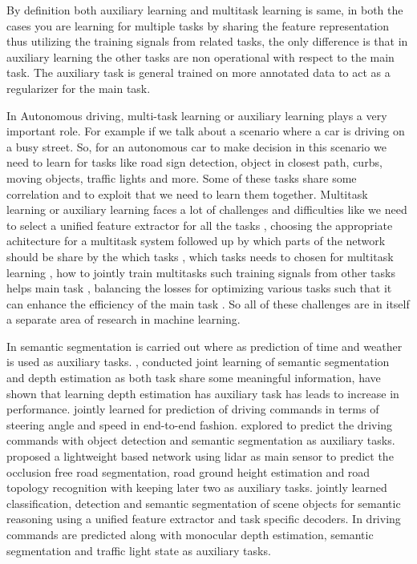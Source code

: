     By definition both auxiliary learning and multitask learning is same, in both the cases you are learning for multiple tasks by sharing the feature representation thus utilizing the training signals from related tasks, the only difference is that in auxiliary learning the other tasks are non operational with respect to the main task. The auxiliary task is general trained on more annotated data to act as a regularizer for the main task. 
    
    In Autonomous driving, multi-task learning or auxiliary learning plays a very important role. For example if we talk about a scenario where a car is driving on a busy street. So, for an autonomous car to make decision in this scenario we need to learn for tasks like road sign detection, object in closest path, curbs, moving objects, traffic lights and more. Some of these tasks share some correlation and to exploit that we need to learn them together. Multitask learning or auxiliary learning faces a lot of challenges and difficulties like we need to select a unified feature extractor for all the tasks \cite{DBLP:journals/corr/abs-2108-11353}, choosing the appropriate achitecture for a multitask system followed up by which parts of the network should be share by the which tasks \cite {Liu_2020_ACCV} \cite{ruder2018latent} \cite{DBLP:journals/corr/abs-1904-02920}, which tasks needs to chosen for multitask learning \cite{DBLP:journals/corr/abs-2110-07301} \cite{DBLP:journals/corr/abs-1904-04153}, how to jointly train multitasks such training signals from other tasks helps main task \cite{DBLP:journals/corr/abs-1903-12117} \cite{DBLP:journals/corr/abs-2007-06889} \cite{DBLP:journals/corr/abs-2001-06782} \cite{Guo_2018_ECCV}, balancing the losses for optimizing various tasks such that it can enhance the efficiency of the main task \cite{DBLP:journals/corr/abs-1904-08492} \cite{pmlr-v80-chen18a} \cite{du2020adapting}. So all of these challenges are in itself a separate area of research in machine learning. 
    
    In \cite{DBLP:journals/corr/abs-1805-06334} semantic segmentation is carried out where as prediction of time and weather is used as auxiliary tasks. \cite{teichmann2018multinet}, \cite{7785137} conducted joint learning of semantic segmentation and depth estimation as both task share some meaningful information, have shown that learning depth estimation has auxiliary task has leads to increase in performance. \cite{yang2018endtoend} jointly learned for prediction of driving commands in terms of steering angle and speed in end-to-end fashion. \cite{Wang2019EndtoEndSU} explored to predict the driving commands with object detection and semantic segmentation as auxiliary tasks. \cite{9090850} proposed a lightweight based network using lidar as main sensor to predict the occlusion free road segmentation, road ground height estimation and road topology recognition with keeping later two as auxiliary tasks. \cite{teichmann2018multinet} jointly learned classification, detection and semantic segmentation of scene objects for semantic reasoning using a unified feature extractor and task specific decoders. In \cite{9523129} driving commands are predicted along with monocular depth estimation, semantic segmentation and traffic light state as auxiliary tasks. 
    

